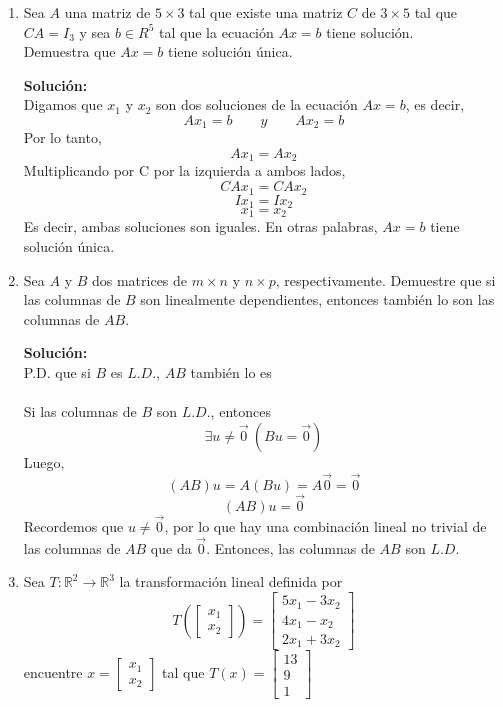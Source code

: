 \documentclass[12pt]{article}
\newenvironment{solucion}
{\begin{mdframed}[backgroundcolor=black!10]
		{\bf Solución:}\\
	}
	{
	\end{mdframed}
}
\newenvironment{preguntas}
{\begin{enumerate}\itemsep12pt
	}
	{
	\end{enumerate}
}
\newcommand{\ra}{\rightarrow}
\newcommand{\R}{\mathbb{R}}
\begin{document}
\begin{preguntas}
\begin{solucion}
$$\begin{bmatrix}
0 & 1
\end{bmatrix}
$$
\end{solucion}
\item Sea $A$ una matriz de $5 \times 3$ tal que existe una matriz $C$ de $3 \times 5$ tal que $CA = I_3$ y sea $b \in R^5$ tal que la ecuación $Ax = b$ tiene solución.\\
Demuestra que $Ax = b$ tiene solución única.
\begin{solucion}
Digamos que $x_1$ y $x_2$ son dos soluciones de la ecuación $Ax = b$, es decir,
$$Ax_1 = b \qquad y \qquad Ax_2 = b$$
Por lo tanto,
$$Ax_1 = Ax_2$$
Multiplicando por C por la izquierda a ambos lados,
$$CAx_1 = CAx_2$$
$$Ix_1 = Ix_2$$
$$x_1 = x_2$$
Es decir, ambas soluciones son iguales. En otras palabras, $Ax = b$ tiene solución única.
\end{solucion}
\item Sea $A$ y $B$ dos matrices de $m\times n$ y $n \times p$, respectivamente. Demuestre que si las columnas de $B$ son linealmente dependientes, entonces también lo son las columnas de $AB$.
\begin{solucion}
P.D. que si $B$ es $L.D.$, $AB$ también lo es\\
		\\
		Si las columnas de $B$ son $L.D.$, entonces
		$$\exists u \neq \vec{0}\ ( Bu = \vec{0})$$
		Luego,
		$$(AB)u = A(Bu) = A\vec{0} = \vec{0}$$
		$$(AB)u = \vec{0}$$
		Recordemos que $u \neq \vec{0}$, por lo que hay una combinación lineal no trivial de las columnas de $AB$ que da $\vec{0}$. Entonces, las columnas de $AB$ son $L.D.$
\end{solucion}
\item Sea $T: \R^2 \ra \R^3$ la transformación lineal definida por
	$$ T\left(\begin{bmatrix}
	x_1\\
	x_2
	\end{bmatrix}\right) = \begin{bmatrix}
	5x_1 - 3x_2\\
	4x_1 -x_2\\
	2x_1 +3x_2
	\end{bmatrix}$$
	encuentre $x = \begin{bmatrix}
	x_1\\
	x_2
	\end{bmatrix}$ tal que $T(x) = \begin{bmatrix}
	13\\
	9\\
	1
	\end{bmatrix}$

\end{preguntas}
\end{document}
